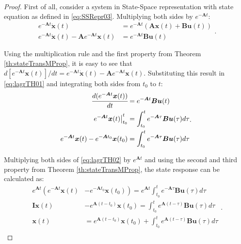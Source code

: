 \documentclass[a4paper,11pt]{book}
\numberwithin{figure}{chapter}
\numberwithin{equation}{chapter}
\numberwithin{table}{chapter}
\theoremstyle{definition}
\begin{document}
\begin{proof}
    First of all, consider a system in State-Space representation with state equation as defined in \eqref{eq:SSRepr03}. Multiplying both sides by $e^{-\bm{A} t}$:
    \begin{equation} \label{eq:lagrTH01}
    \begin{split}
        e^{-\bm{A} t} \dot{\bm{x}}(t) &= e^{-\bm{A} t} (\bm{A} \bm{x}(t) + \bm{B} \bm{u}(t)) \\
        e^{-\bm{A} t} \dot{\bm{x}}(t) - \bm{A}e^{-\bm{A} t} \bm{x}(t)  &=  e^{-\bm{A} t} \bm{B} \bm{u}(t)
    \end{split}
    .\end{equation}
    
\noindent Using the multiplication rule and the first property from Theorem \ref{th:stateTransMProp}, it is easy to see that $d[e^{-\bm{A} t} \bm{x}(t)]/dt = e^{-\bm{A} t} \dot{\bm{x}}(t) - \bm{A} e^{-\bm{A} t} \bm{x}(t)$. Substituting this result in \eqref{eq:lagrTH01} and integrating both sides from $t_0$ to $t$:
    \begin{equation} \label{eq:lagrTH02}
    \begin{split}
        \cfrac{d(e^{-\bm{A} t} \bm{x}(t))}{dt} &= e^{-\bm{A} t} \bm{B} \bm{u}(t) \\
        \left. e^{-\bm{A} t} \bm{x}(t) \right|^{t}_{t_0}  &= \int_{t_0}^{t} e^{-\bm{A} \tau} \bm{B} \bm{u}(\tau) d\tau \\
        e^{-\bm{A} t} \bm{x}(t) - e^{-\bm{A} t_0} \bm{x}(t_0)  &= \int_{t_0}^{t} e^{-\bm{A} \tau} \bm{B} \bm{u}(\tau) d\tau
    \end{split}
    .\end{equation}
    
\noindent Multiplying both sides of \eqref{eq:lagrTH02} by $e^{\bm{A} t}$ and using the second and third property from Theorem \ref{th:stateTransMProp}, the state response can be calculated as:
    \begin{equation} \label{eq:lagrTH03}
    \begin{split}
        e^{\bm{A} t} \left( e^{-\bm{A} t} \bm{x}(t) \right. &- \left. e^{-\bm{A} t_0} \bm{x}(t_0) \right) = e^{\bm{A} t} \int_{t_0}^{t} e^{-\bm{A} \tau} \bm{B} \bm{u}(\tau) d\tau \\
        \bm{I} \bm{x}(t) &- e^{\bm{A} (t - t_0)} \bm{x}(t_0) = \int_{t_0}^{t} e^{\bm{A}(t - \tau)} \bm{B} \bm{u}(\tau) d\tau \\
        \bm{x}(t) &= e^{\bm{A} (t - t_0)} \bm{x}(t_0) + \int_{t_0}^{t} e^{\bm{A}(t - \tau)} \bm{B} \bm{u}(\tau) d\tau \\
    \end{split}
    .\end{equation}
    

\end{proof}
\end{document}
